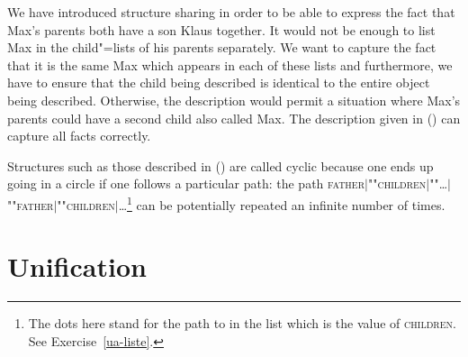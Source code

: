 We have introduced structure sharing in order to be able to express
the fact that Max's parents both have a son Klaus together. It would not be enough to list Max in
the child"=lists of his parents separately. We want to capture the fact that it is the same Max which
appears in each of these lists and furthermore, we have to ensure that the child being described is
identical to the entire object being described. Otherwise, the description would permit a situation where Max's
parents could have a second child also called Max.  The description given in
() can capture all facts correctly.
\begin{figure}
\ea
\label{bsp-avm-zyklen}
 
\z
\vspace{-\baselineskip}\end{figure}%
Structures such as those described in () are called cyclic because one ends up going in a circle if one follows a particular path: \eg the path 
\textsc{father$|$""children$|$""\ldots$|$""father$|$""children$|$\ldots}\footnote{%
	The dots here stand for the path to  in the list which is the value of \textsc{children}. See Exercise~\ref{ua-liste}.%
}
can be potentially repeated an infinite number of times.

\section{Unification}
\label{sec-unification}

